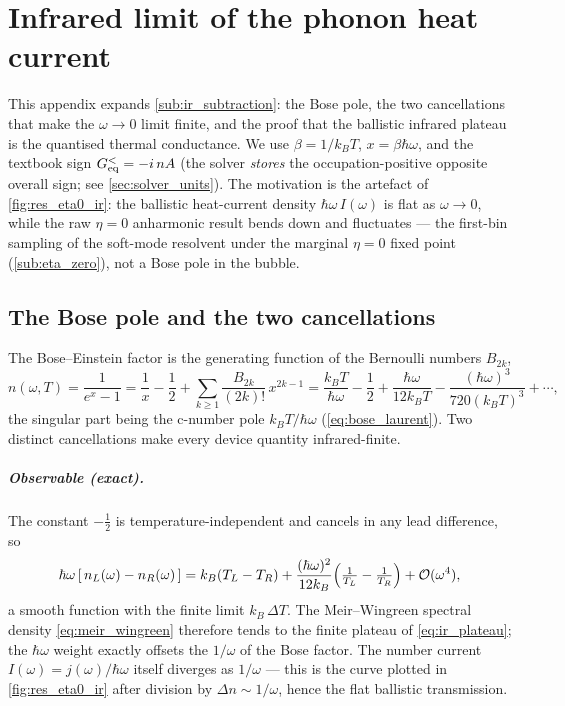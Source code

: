 \chapter{Infrared limit of the phonon heat current}
\label{app:infrared}

This appendix expands \cref{sub:ir_subtraction}: the Bose pole, the two
cancellations that make the $\omega\to0$ limit finite, and the proof that the
ballistic infrared plateau is the quantised thermal conductance. We use
$\beta=1/k_BT$, $x=\beta\hbar\omega$, and the textbook sign
$G^{<}_{\rm eq}=-i\,nA$ (the solver \emph{stores} the occupation-positive
opposite overall sign; see \cref{sec:solver_units}). The motivation is the artefact of \cref{fig:res_eta0_ir}:
the ballistic heat-current density $\hbar\omega\,I(\omega)$ is flat as $\omega\to0$,
while the raw $\eta=0$ anharmonic result bends down and fluctuates --- the first-bin
sampling of the soft-mode resolvent under the marginal $\eta=0$ fixed point
(\cref{sub:eta_zero}), not a Bose pole in the bubble.

\section{The Bose pole and the two cancellations}
\label{sec:ir_pole}

The Bose--Einstein factor is the generating function of the Bernoulli numbers
$B_{2k}$,
\begin{equation}\label{eq:bose_bernoulli}
  n(\omega,T)=\frac{1}{e^{x}-1}
  =\frac1x-\frac12+\sum_{k\ge1}\frac{B_{2k}}{(2k)!}\,x^{2k-1}
  =\frac{k_BT}{\hbar\omega}-\frac12+\frac{\hbar\omega}{12k_BT}
   -\frac{(\hbar\omega)^3}{720(k_BT)^3}+\cdots,
\end{equation}
the singular part being the c-number pole $k_BT/\hbar\omega$ (\cref{eq:bose_laurent}).
Two distinct cancellations make every device quantity infrared-finite.

\paragraph{Observable (exact).}
The constant $-\tfrac12$ is temperature-independent and cancels in any lead
difference, so
\begin{equation}\label{eq:ir_hbarw}
  \hbar\omega\,[\,n_L(\omega)-n_R(\omega)\,]
  = k_B(T_L-T_R) + \frac{(\hbar\omega)^2}{12k_B}
    \Bigl(\tfrac{1}{T_L}-\tfrac{1}{T_R}\Bigr)+\mathcal{O}(\omega^4),
\end{equation}
a smooth function with the finite limit $k_B\,\Delta T$. The Meir--Wingreen
spectral density \cref{eq:meir_wingreen} therefore tends to the finite plateau of
\cref{eq:ir_plateau}; the $\hbar\omega$ weight exactly offsets the $1/\omega$ of the
Bose factor. The number current $I(\omega)=j(\omega)/\hbar\omega$ itself diverges as
$1/\omega$ --- this is the curve plotted in \cref{fig:res_eta0_ir} after division by
$\Delta n\sim1/\omega$, hence the flat ballistic transmission.

